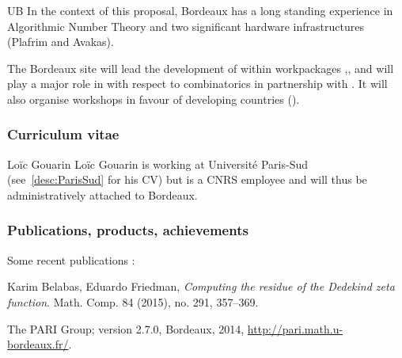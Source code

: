 \begin{sitedescription}{UB}
\medskip
In the context of this proposal, Bordeaux has a long standing experience in
Algorithmic Number Theory and two significant hardware infrastructures
(Plafrim and Avakas).

The Bordeaux site will lead the development of \PariGP within
workpackages ,,  and will play
a major role in  with respect to combinatorics in partnership with .
It will also organise workshops in favour of developing countries ().

\subsubsection*{Curriculum vitae}








\begin{participant}[type=R,PM=5,gender=male]{Lo\"ic Gouarin}
  Loïc Gouarin is working at Université Paris-Sud
  (see~\ref{desc:ParisSud} for his CV) but is a CNRS employee and will
  thus be administratively attached to Bordeaux.
\end{participant}



\subsubsection*{Publications, products, achievements}

Some recent publications :
\begin{compactenum}
\item 
Karim Belabas, Eduardo Friedman,
\textit{Computing the residue of the Dedekind zeta function}.
Math. Comp. 84 (2015), no. 291, 357--369. 

\item
The PARI Group; \PariGP version 2.7.0, Bordeaux, 2014,
\url{http://pari.math.u-bordeaux.fr/}.


\end{compactenum}
\end{sitedescription}
